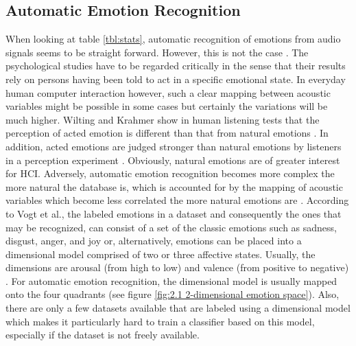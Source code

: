 \documentclass[11pt,a4paper,twoside]{article}
\theoremstyle{thmbreak}
\numberwithin{Theorem}{subsection}
\theoremstyle{defbreak}
\theoremstyle{remark}
\theoremstyle{remark}
\begin{document}
\subsection{Automatic Emotion Recognition}
When looking at table \ref{tbl:stats}, automatic recognition of emotions from audio signals seems to be straight forward. However, this is not the case \cite{vogt2008automatic}.
The psychological studies have to be regarded critically in the sense that their results rely on persons having been told to act in a specific emotional state. 
In everyday human computer interaction however, such a clear mapping between  acoustic variables might be possible in some cases but certainly the variations will be much higher. 
Wilting and Krahmer show in human listening tests that the perception of acted emotion is different than that from natural emotions \cite{Wilting2006RealVA}. 
In addition, acted emotions are judged stronger than natural emotions by listeners in a perception experiment \cite{velten1968laboratory}. Obviously, natural emotions are of greater interest for HCI.
Adversely, automatic emotion recognition becomes more complex the more natural the database is, which is accounted for by the mapping of acoustic variables which become less correlated the more natural emotions are \cite{vogt2008automatic}.
According to Vogt et al., the labeled emotions in a dataset and consequently the ones that may be recognized, can consist  of a set of the classic emotions such as sadness, disgust, anger, and joy or, alternatively, emotions can be placed into a dimensional model comprised of two or three affective states. 
Usually, the dimensions are arousal (from high to low) and valence (from positive to negative) \cite{vogt2008automatic}.
For automatic emotion recognition, the dimensional model is usually mapped onto the four quadrants (see figure \ref{fig:2.1 2-dimensional emotion space}). 
Also, there are only a few datasets available that are labeled using a dimensional model \cite{vogt2008automatic} which makes it particularly hard to train a classifier based on this model, especially if the dataset is not freely available.
\end{document}
